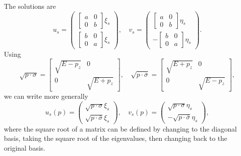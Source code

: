 The solutions are
\begin{equation}
	u_{s}=\left(\begin{array}{ll}
	\left[\begin{array}{ll}
		a & 0 \\
		0 & b
	\end{array}\right] \xi_{s} \\
	\left[\begin{array}{ll}
		b & 0 \\
		0 & a
	\end{array}\right] \xi_{s}
	\end{array}\right), \quad 
	v_{s}=\left(\begin{array}{ll}
	\left[\begin{array}{ll}
		a & 0 \\
		0 & b
	\end{array}\right] \eta_{s} \\
	-\left[\begin{array}{ll}
		b & 0 \\
		0 & a
	\end{array}\right] \eta_{s}
	\end{array}\right).
\end{equation}
Using
\begin{equation}
	\sqrt{p \cdot \sigma}=\left[\begin{array}{cc}
		\sqrt{E-p_{z}} & 0 \\
		0 & \sqrt{E+p_{z}}
	\end{array}\right], \quad 
	\sqrt{p \cdot \bar{\sigma}}=\left[\begin{array}{cc}
		\sqrt{E+p_{z}} & 0 \\
		0 & \sqrt{E-p_{z}}
	\end{array}\right],
\end{equation}
we can write more generally
\begin{equation}
	u_{s}(p) = \left(\begin{array}{c}
		\sqrt{p \cdot \sigma} \xi_{s} \\
		\sqrt{p \cdot \bar{\sigma}} \xi_{s}
	\end{array}\right), \quad 
	v_{s}(p) = \left(\begin{array}{c}
		\sqrt{p \cdot \sigma} \eta_{s} \\
		-\sqrt{p \cdot \bar{\sigma}} \eta_{s}
	\end{array}\right),
\end{equation}
where the square root of a matrix can be defined by changing to the diagonal basis, taking the square root of the eigenvalues, then changing back to the original basis. 
